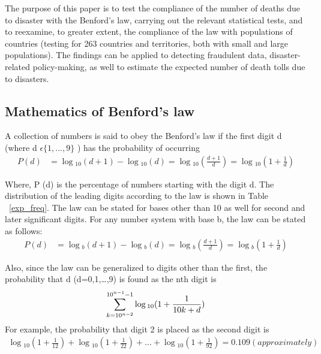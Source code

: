 The purpose of this paper is to test the compliance of the number of deaths due to disaster with the Benford’s law, carrying out the relevant statistical tests, and to reexamine, to greater extent, the compliance of the law with populations of countries (testing for 263 countries and territories, both with small and large populations). The findings can be applied to detecting fraudulent data, disaster-related policy-making, as well to estimate the expected number of death tolls due to disasters.  

\subsection{Mathematics of Benford’s law}
A collection of numbers is said to obey the Benford’s law if the first digit d (where d $\epsilon \{1,...,9\}$ ) has the probability of occurring 
\begin{equation} 
\begin{split}
P(d) &= \log{_{10}(d+1) - \log{_{10}(d)}} = \log{_{10}(\frac{d+1}{d})} = \log{_{10}(1+\frac{1}{d})}
\end{split}
\end{equation}

Where, P (d) is the percentage of numbers starting with the digit d.  
The distribution of the leading digits according to the law is shown in Table ~\ref{exp_freq}. The law can be stated for bases other than 10 as well for second and later significant digits. For any number system with base b, the law can be stated as follows: \\
\begin{equation} 
\begin{split}
P(d) &= \log{_{b}(d+1) - \log{_{b}(d)}} = \log{_{b}(\frac{d+1}{d})} = \log{_{b}(1+\frac{1}{d})}
\end{split}
\end{equation}

Also, since the law can be generalized to digits other than the first, the probability that d (d=0,1,…,9) is found as the nth digit is 
\begin{equation} 
\sum_{k=10^{n-2}}^{10^{n-1}-1} \log{_{10}(1+\frac{1}{10k+d})} \\
\end{equation}
For example, the probability that digit 2 is placed as the second digit is \\
\begin{equation} 
\begin{split}
\log{_{10}(1+\frac{1}{12})}+\log{_{10}(1+\frac{1}{22})}+...+\log{_{10}(1+\frac{1}{92})} = 0.109 (approximately)
\end {split}
\end{equation}

